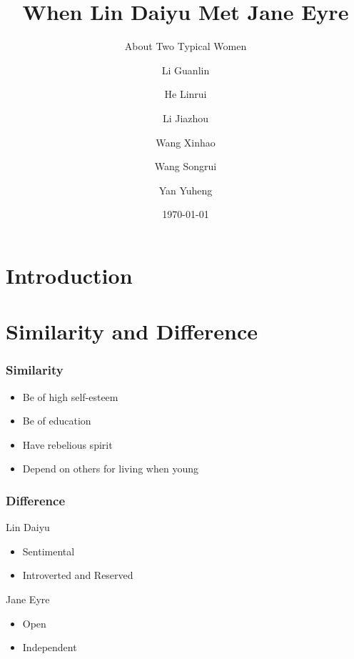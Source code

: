\documentclass{beamer}
\title[About Women]
{When Lin Daiyu Met Jane Eyre}
\subtitle{About Two Typical Women}
\author[] %
{Li Guanlin\inst{1} \and He Linrui\inst{1} \and Li Jiazhou \inst{1} \and Wang Xinhao \inst{1} \and Wang Songrui \inst{1}\and Yan Yuheng \inst{1}}
\institute[NJU] %
{
\inst{1}%
Undergraduates of ICS\\
Nanjing University
}
\date[NJU 2023] %
{\today}
\begin{document}
\begin{frame}
    \titlepage
    \begin{figure}[htpb]
    \end{figure}
\end{frame}

\begin{frame}
    \tableofcontents[sectionstyle=show,subsectionstyle=show/shaded/hide,subsubsectionstyle=show/shaded/hide]
\end{frame}

\section{Introduction}

\section{Similarity and Difference}

\begin{frame}
    \frametitle{Similarity}
    \Large
    \begin{itemize}[<+->]
        \item Be of high self-esteem
        \item Be of education
        \item Have rebelious spirit
        \item Depend on others for living when young
    \end{itemize}
\end{frame}

\begin{frame}
    \frametitle{Difference}
    \Large
    \begin{block}{Lin Daiyu}
        \begin{itemize}
            \item Sentimental
            \item Introverted and Reserved
        \end{itemize}        
    \end{block}
    \begin{block}{Jane Eyre}
        \begin{itemize}
            \item Open 
            \item Independent
        \end{itemize}
    \end{block}
\end{frame}
\end{document}
